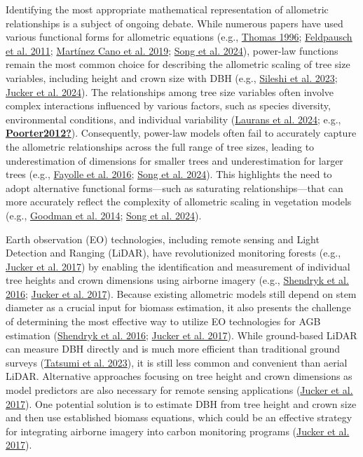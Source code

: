 \documentclass[
  12pt,
  letterpaper,
  DIV=11,
  numbers=noendperiod]{scrartcl}
\begin{document}
Identifying the most appropriate mathematical representation of
allometric relationships is a subject of ongoing debate. While numerous
papers have used various functional forms for allometric equations
(e.g., \protect\hyperlink{ref-Thomas1996}{Thomas 1996};
\protect\hyperlink{ref-Feldpausch2011}{Feldpausch et al. 2011};
\protect\hyperlink{ref-MartinezCano2019}{Martínez Cano et al. 2019};
\protect\hyperlink{ref-Song2024}{Song et al. 2024}), power-law functions
remain the most common choice for describing the allometric scaling of
tree size variables, including height and crown size with DBH (e.g.,
\protect\hyperlink{ref-Sileshi2023}{Sileshi et al. 2023};
\protect\hyperlink{ref-Jucker2024}{Jucker et al. 2024}). The
relationships among tree size variables often involve complex
interactions influenced by various factors, such as species diversity,
environmental conditions, and individual variability
(\protect\hyperlink{ref-Laurans2024}{Laurans et al. 2024}; e.g.,
\protect\hyperlink{ref-Poorter2012}{\textbf{Poorter2012?}}).
Consequently, power-law models often fail to accurately capture the
allometric relationships across the full range of tree sizes, leading to
underestimation of dimensions for smaller trees and underestimation for
larger trees (e.g., \protect\hyperlink{ref-Fayolle2016}{Fayolle et al.
2016}; \protect\hyperlink{ref-Song2024}{Song et al. 2024}). This
highlights the need to adopt alternative functional forms---such as
saturating relationships---that can more accurately reflect the
complexity of allometric scaling in vegetation models (e.g.,
\protect\hyperlink{ref-Goodman2014}{Goodman et al. 2014};
\protect\hyperlink{ref-Song2024}{Song et al. 2024}).

Earth observation (EO) technologies, including remote sensing and Light
Detection and Ranging (LiDAR), have revolutionized monitoring forests
(e.g., \protect\hyperlink{ref-Jucker2017}{Jucker et al. 2017}) by
enabling the identification and measurement of individual tree heights
and crown dimensions using airborne imagery (e.g.,
\protect\hyperlink{ref-Shendryk2016}{Shendryk et al. 2016};
\protect\hyperlink{ref-Jucker2017}{Jucker et al. 2017}). Because
existing allometric models still depend on stem diameter as a crucial
input for biomass estimation, it also presents the challenge of
determining the most effective way to utilize EO technologies for AGB
estimation (\protect\hyperlink{ref-Shendryk2016}{Shendryk et al. 2016};
\protect\hyperlink{ref-Jucker2017}{Jucker et al. 2017}). While
ground-based LiDAR can measure DBH directly and is much more efficient
than traditional ground surveys
(\protect\hyperlink{ref-Tatsumi2023}{Tatsumi et al. 2023}), it is still
less common and convenient than aerial LiDAR. Alternative approaches
focusing on tree height and crown dimensions as model predictors are
also necessary for remote sensing applications
(\protect\hyperlink{ref-Jucker2017}{Jucker et al. 2017}). One potential
solution is to estimate DBH from tree height and crown size and then use
established biomass equations, which could be an effective strategy for
integrating airborne imagery into carbon monitoring programs
(\protect\hyperlink{ref-Jucker2017}{Jucker et al. 2017}).
\end{document}
